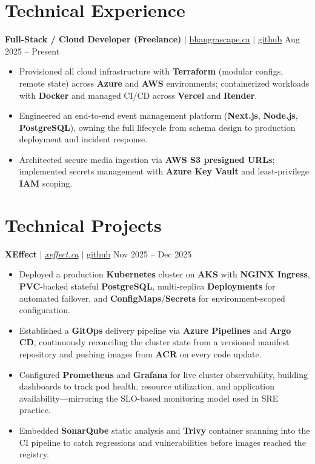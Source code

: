 \documentclass[11pt,a4paper]{article}
\begin{document}
\section{Technical Experience}

\textbf{Full-Stack / Cloud Developer (Freelance)} $|$ \href{https://bhangrascape.ca}{bhangrascape.ca} $|$ \href{https://github.com/bhat0155/bhangraescape}{\small github} \hfill Aug 2025 -- Present
\begin{itemize}
    \item Provisioned all cloud infrastructure with \textbf{Terraform} (modular configs, remote state) across \textbf{Azure} and \textbf{AWS} environments; containerized workloads with \textbf{Docker} and managed CI/CD across \textbf{Vercel} and \textbf{Render}.
    \item Engineered an end-to-end event management platform (\textbf{Next.js}, \textbf{Node.js}, \textbf{PostgreSQL}), owning the full lifecycle from schema design to production deployment and incident response.
    \item Architected secure media ingestion via \textbf{AWS S3 presigned URLs}; implemented secrets management with \textbf{Azure Key Vault} and least-privilege \textbf{IAM} scoping.
\end{itemize}

\section{Technical Projects}

\textbf{XEffect} $|$ \href{https://www.xeffect.ca/app}{\emph{xeffect.ca}} $|$ \href{https://github.com/bhat0155/xeffect}{\small github} \hfill Nov 2025 -- Dec 2025
\begin{itemize}
    \item Deployed a production \textbf{Kubernetes} cluster on \textbf{AKS} with \textbf{NGINX Ingress}, \textbf{PVC}-backed stateful \textbf{PostgreSQL}, multi-replica \textbf{Deployments} for automated failover, and \textbf{ConfigMaps}/\textbf{Secrets} for environment-scoped configuration.
    \item Established a \textbf{GitOps} delivery pipeline via \textbf{Azure Pipelines} and \textbf{Argo CD}, continuously reconciling the cluster state from a versioned manifest repository and pushing images from \textbf{ACR} on every code update.
    \item Configured \textbf{Prometheus} and \textbf{Grafana} for live cluster observability, building dashboards to track pod health, resource utilization, and application availability---mirroring the SLO-based monitoring model used in SRE practice.
    \item Embedded \textbf{SonarQube} static analysis and \textbf{Trivy} container scanning into the CI pipeline to catch regressions and vulnerabilities before images reached the registry.
\end{itemize}
\end{document}
